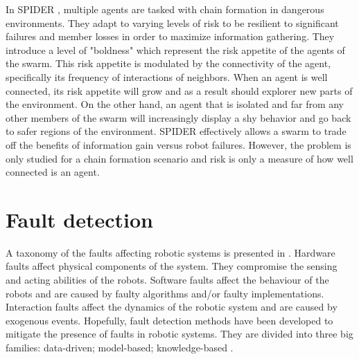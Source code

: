 In SPIDER \cite{hunt2020spider}, multiple agents are tasked with chain formation in dangerous environments. They adapt to varying levels of risk to be resilient to significant failures and member losses in order to maximize information gathering. They introduce a level of "boldness" which represent the risk appetite of the agents of the swarm. This risk appetite is modulated by the connectivity of the agent, specifically its frequency of interactions of neighbors. When an agent is well connected, its risk appetite will grow and as a result should explorer new parts of the environment. On the other hand, an agent that is isolated and far from any other members of the swarm will increasingly display a shy behavior and go back to safer regions of the environment. SPIDER effectively allows a swarm to trade off the benefits of information gain versus robot failures. However, the problem is only studied for a chain formation scenario and risk is only a measure of how well connected is an agent.  






\section{Fault detection}

A taxonomy of the faults affecting robotic systems is presented in \cite{khalastchi2018fault}. Hardware faults affect physical components of the system. They compromise the sensing and acting abilities of the robots. Software faults affect the behaviour of the robots and are caused by faulty algorithms and/or faulty implementations. Interaction faults affect the dynamics of the robotic system and are caused by exogenous events. Hopefully, fault detection methods have been developed to mitigate the presence of faults in robotic systems. They are divided into three big families: data-driven; model-based; knowledge-based \cite{khalastchi2018fault}. 

